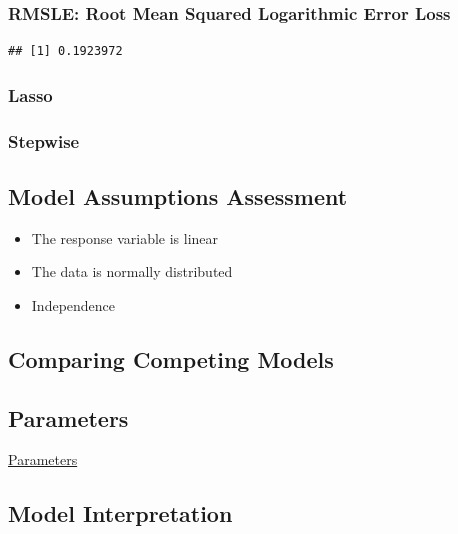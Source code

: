 \documentclass[american,]{article}
\providecommand{\tightlist}{%
  \setlength{\itemsep}{0pt}\setlength{\parskip}{0pt}}
\begin{document}
\hypertarget{rmsle-root-mean-squared-logarithmic-error-loss}{%
\subsubsection{RMSLE: Root Mean Squared Logarithmic Error Loss}\label{rmsle-root-mean-squared-logarithmic-error-loss}}

\begin{verbatim}
## [1] 0.1923972
\end{verbatim}

\hypertarget{lasso}{%
\subsubsection{Lasso}\label{lasso}}

\hypertarget{stepwise}{%
\subsubsection{Stepwise}\label{stepwise}}

\newpage

\hypertarget{model-assumptions-assessment}{%
\subsection{Model Assumptions Assessment}\label{model-assumptions-assessment}}

\begin{itemize}
\tightlist
\item
  The response variable is linear
\item
  The data is normally distributed
\item
  Independence
\end{itemize}

\hypertarget{comparing-competing-models}{%
\subsection{Comparing Competing Models}\label{comparing-competing-models}}

\newpage

\hypertarget{parameters}{%
\subsection{Parameters}\label{parameters}}

\protect\hyperlink{parameters}{Parameters}

\hypertarget{model-interpretation}{%
\subsection{Model Interpretation}\label{model-interpretation}}
\end{document}
